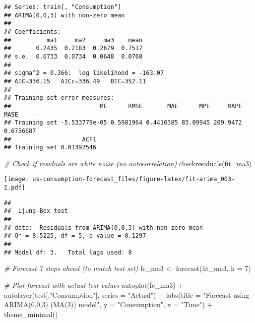 \documentclass[
  12pt,
]{article}
\newenvironment{Shaded}{\begin{snugshade}}{\end{snugshade}}
\newcommand{\AttributeTok}[1]{\textcolor[rgb]{0.77,0.63,0.00}{#1}}
\newcommand{\CommentTok}[1]{\textcolor[rgb]{0.56,0.35,0.01}{\textit{#1}}}
\newcommand{\DecValTok}[1]{\textcolor[rgb]{0.00,0.00,0.81}{#1}}
\newcommand{\FunctionTok}[1]{\textcolor[rgb]{0.00,0.00,0.00}{#1}}
\newcommand{\NormalTok}[1]{#1}
\newcommand{\OtherTok}[1]{\textcolor[rgb]{0.56,0.35,0.01}{#1}}
\newcommand{\SpecialCharTok}[1]{\textcolor[rgb]{0.00,0.00,0.00}{#1}}
\newcommand{\StringTok}[1]{\textcolor[rgb]{0.31,0.60,0.02}{#1}}
\begin{document}
\begin{verbatim}
## Series: train[, "Consumption"] 
## ARIMA(0,0,3) with non-zero mean 
## 
## Coefficients:
##          ma1     ma2     ma3    mean
##       0.2435  0.2183  0.2679  0.7517
## s.e.  0.0733  0.0734  0.0648  0.0768
## 
## sigma^2 = 0.366:  log likelihood = -163.07
## AIC=336.15   AICc=336.49   BIC=352.11
## 
## Training set error measures:
##                         ME      RMSE       MAE      MPE     MAPE      MASE
## Training set -5.533779e-05 0.5981964 0.4416385 83.09945 209.9472 0.6756687
##                    ACF1
## Training set 0.01392546
\end{verbatim}

\begin{Shaded}
\begin{Highlighting}[]
\CommentTok{\# Check if residuals are white noise (no autocorrelation)}
\FunctionTok{checkresiduals}\NormalTok{(fit\_ma3)}
\end{Highlighting}
\end{Shaded}

\texttt{[image: us-consumption-forecast\_files/figure-latex/fit-arima\_003-1.pdf]}

\begin{verbatim}
## 
##  Ljung-Box test
## 
## data:  Residuals from ARIMA(0,0,3) with non-zero mean
## Q* = 8.5225, df = 5, p-value = 0.1297
## 
## Model df: 3.   Total lags used: 8
\end{verbatim}

\begin{Shaded}
\begin{Highlighting}[]
\CommentTok{\# Forecast 7 steps ahead (to match test set)}
\NormalTok{fc\_ma3 }\OtherTok{\textless{}{-}} \FunctionTok{forecast}\NormalTok{(fit\_ma3, }\AttributeTok{h =} \DecValTok{7}\NormalTok{)}

\CommentTok{\# Plot forecast with actual test values}
\FunctionTok{autoplot}\NormalTok{(fc\_ma3) }\SpecialCharTok{+}
  \FunctionTok{autolayer}\NormalTok{(test[,}\StringTok{"Consumption"}\NormalTok{], }\AttributeTok{series =} \StringTok{"Actual"}\NormalTok{) }\SpecialCharTok{+}
  \FunctionTok{labs}\NormalTok{(}\AttributeTok{title =} \StringTok{"Forecast using ARIMA(0,0,3) (MA(3)) model"}\NormalTok{,}
       \AttributeTok{y =} \StringTok{"Consumption"}\NormalTok{, }\AttributeTok{x =} \StringTok{"Time"}\NormalTok{) }\SpecialCharTok{+}
  \FunctionTok{theme\_minimal}\NormalTok{()}
\end{Highlighting}
\end{Shaded}
\end{document}
